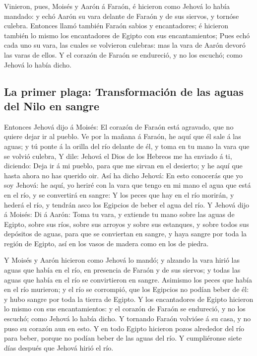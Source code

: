  Vinieron, pues, Moisés y Aarón á Faraón, é hicieron como
Jehová lo había mandado: y echó Aarón su vara delante de Faraón y de sus
siervos, y tornóse culebra.  Entonces llamó también
Faraón sabios y encantadores; é hicieron también lo mismo los
encantadores de Egipto con sus encantamientos;  Pues echó
cada uno su vara, las cuales se volvieron culebras: mas la vara de Aarón
devoró las varas de ellos.  Y el corazón de Faraón se
endureció, y no los escuchó; como Jehová lo había dicho.

\hypertarget{la-primer-plaga-transformaciuxf3n-de-las-aguas-del-nilo-en-sangre}{%
\subsection{La primer plaga: Transformación de las aguas del Nilo en
sangre}\label{la-primer-plaga-transformaciuxf3n-de-las-aguas-del-nilo-en-sangre}}

 Entonces Jehová dijo á Moisés: El corazón de Faraón está
agravado, que no quiere dejar ir al pueblo.  Ve por la
mañana á Faraón, he aquí que él sale á las aguas; y tú ponte á la orilla
del río delante de él, y toma en tu mano la vara que se volvió culebra,
 Y dile: Jehová el Dios de los Hebreos me ha enviado á
ti, diciendo: Deja ir á mi pueblo, para que me sirvan en el desierto; y
he aquí que hasta ahora no has querido oir.  Así ha dicho
Jehová: En esto conocerás que yo soy Jehová: he aquí, yo heriré con la
vara que tengo en mi mano el agua que está en el río, y se convertirá en
sangre:  Y los peces que hay en el río morirán, y hederá
el río, y tendrán asco los Egipcios de beber el agua del río.
 Y Jehová dijo á Moisés: Di á Aarón: Toma tu vara, y
extiende tu mano sobre las aguas de Egipto, sobre sus ríos, sobre sus
arroyos y sobre sus estanques, y sobre todos sus depósitos de aguas,
para que se conviertan en sangre, y haya sangre por toda la región de
Egipto, así en los vasos de madera como en los de piedra.

 Y Moisés y Aarón hicieron como Jehová lo mandó; y
alzando la vara hirió las aguas que había en el río, en presencia de
Faraón y de sus siervos; y todas las aguas que había en el río se
convirtieron en sangre.  Asimismo los peces que había en
el río murieron; y el río se corrompió, que los Egipcios no podían beber
de él: y hubo sangre por toda la tierra de Egipto.  Y los
encantadores de Egipto hicieron lo mismo con sus encantamientos: y el
corazón de Faraón se endureció, y no los escuchó; como Jehová lo había
dicho.  Y tornando Faraón volvióse á su casa, y no puso
su corazón aun en esto.  Y en todo Egipto hicieron pozos
alrededor del río para beber, porque no podían beber de las aguas del
río.  Y cumpliéronse siete días después que Jehová hirió
el río.

